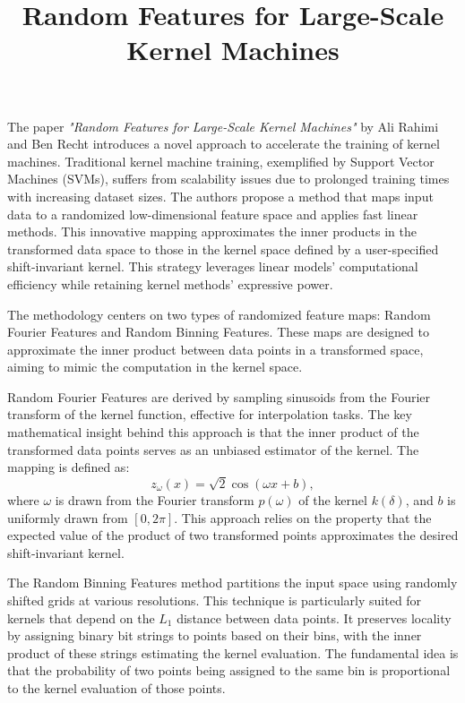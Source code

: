 \documentclass{article}
\title{Random Features for Large-Scale Kernel Machines}
\date{}
\begin{document}
\maketitle
The paper \textit{"Random Features for Large-Scale Kernel Machines"} by Ali Rahimi and Ben Recht introduces a novel approach to accelerate the training of kernel machines. Traditional kernel machine training, exemplified by Support Vector Machines (SVMs), suffers from scalability issues due to prolonged training times with increasing dataset sizes. The authors propose a method that maps input data to a randomized low-dimensional feature space and applies fast linear methods. This innovative mapping approximates the inner products in the transformed data space to those in the kernel space defined by a user-specified shift-invariant kernel. This strategy leverages linear models' computational efficiency while retaining kernel methods' expressive power.

The methodology centers on two types of randomized feature maps: Random Fourier Features and Random Binning Features. These maps are designed to approximate the inner product between data points in a transformed space, aiming to mimic the computation in the kernel space.

Random Fourier Features are derived by sampling sinusoids from the Fourier transform of the kernel function, effective for interpolation tasks. The key mathematical insight behind this approach is that the inner product of the transformed data points serves as an unbiased estimator of the kernel. The mapping is defined as:
\begin{equation}
    z_{\omega}(x) = \sqrt{2} \cos(\omega x + b),
\end{equation}
where $\omega$ is drawn from the Fourier transform $p(\omega)$ of the kernel $k(\delta)$, and $b$ is uniformly drawn from $[0, 2\pi]$. This approach relies on the property that the expected value of the product of two transformed points approximates the desired shift-invariant kernel.

The Random Binning Features method partitions the input space using randomly shifted grids at various resolutions. This technique is particularly suited for kernels that depend on the $L_1$ distance between data points. It preserves locality by assigning binary bit strings to points based on their bins, with the inner product of these strings estimating the kernel evaluation. The fundamental idea is that the probability of two points being assigned to the same bin is proportional to the kernel evaluation of those points.
\end{document}
